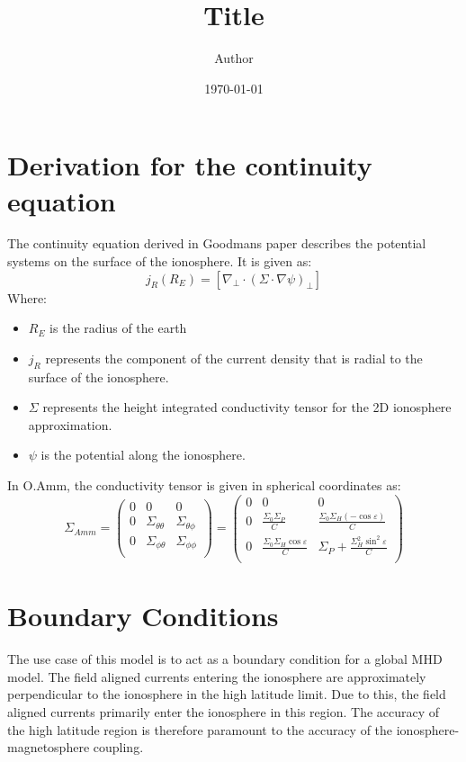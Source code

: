 \documentclass[11pt]{article}
\title{ Title}
\author{ Author }
\date{\today}
\begin{document}
\section{Derivation for the continuity equation}
The continuity equation derived in Goodmans paper describes the potential systems on the surface of the ionosphere. It is given as:
\begin{equation}
	j_R(R_E) = \left[\nabla_\perp \cdot (\Sigma \cdot \nabla\psi)_\perp\right]
	\label{eqn:continuity_eqn}
\end{equation}
Where:
\begin{itemize}
	\item $R_E$ is the radius of the earth
	\item $j_R$ represents the component of the current density that is radial to the surface of the ionosphere.
	\item $\Sigma$ represents the height integrated conductivity tensor for the 2D ionosphere approximation.
	\item $\psi$ is the potential along the ionosphere.
\end{itemize}
In O.Amm, the conductivity tensor is given in spherical coordinates as:
\begin{equation}
	\Sigma_{Amm} = \begin{pmatrix}
		0 & 0                      & 0                   \\
		0 & \Sigma_{\theta \theta} & \Sigma_{\theta\phi} \\
		0 & \Sigma_{\phi \theta}   & \Sigma_{\phi\phi}   \\
	\end{pmatrix} =
	\begin{pmatrix}
		0 & 0                                          & 0                                                \\
		0 & \frac{\Sigma_0\Sigma_P}{C}                 & \frac{\Sigma_0\Sigma_H (-\cos\varepsilon)}{C}    \\
		0 & \frac{\Sigma_0\Sigma_H \cos\varepsilon}{C} & \Sigma_P + \frac{\Sigma_H^2\sin^2\varepsilon}{C} \\
	\end{pmatrix}
\end{equation}
\section{Boundary Conditions}
The use case of this model is to act as a boundary condition for a global MHD model. The field aligned currents entering the ionosphere are approximately perpendicular to the ionosphere in the high latitude limit. Due to this, the field aligned currents primarily enter the ionosphere in this region. The accuracy of the high latitude region is therefore paramount to the accuracy of the ionosphere-magnetosphere coupling. \\
\end{document}
